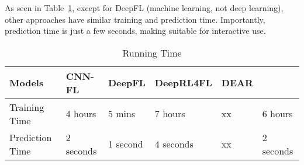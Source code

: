  As seen in Table~\ref{tab:time}, except
for DeepFL (machine learning, not deep learning), other approaches
have similar training and prediction time. Importantly, prediction
time is just a few seconds, making {\tool} suitable for interactive
use.



\begin{table}[t]
	\caption{Running Time}
	\vspace{-12pt}
	\begin{center}
        \tabcolsep 2pt
		\footnotesize
		\renewcommand{\arraystretch}{1} 
		\begin{tabular}{p{1.6cm}<{\centering}|p{1cm}<{\centering}|p{1cm}<{\centering}|p{1.2cm}<{\centering}|p{1cm}<{\centering}|p{1.1cm}<{\centering}}
			\hline
			Models          & CNN-FL & DeepFL & DeepRL4FL & DEAR & {\tool} \\\hline
			Training Time & 4 hours & 5 mins & 7 hours & xx & 6 hours \\
			Prediction Time & 2 seconds & 1 second & 4 seconds & xx & 2 seconds\\ 
			\hline
		\end{tabular}
		\label{tab:time}
	\end{center}
\vspace{-5pt}
\end{table}
